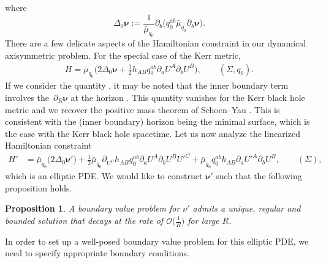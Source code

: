 \documentclass[pdftex]{sigma}
\def\ptl{\partial}%
\def\mbo#1{\boldsymbol{#1}}%
\def\halb{\frac{1}{2}}%
\numberwithin{equation}{section}
\newtheorem{Proposition}[Theorem]{Proposition}
\begin{document}
where
\[
\Delta_0 \mbo{\nu} := \frac{1}{\bar{\mu}_{q_0}} \ptl_b\bigl(q^{ab}_0 \bar{\mu}_{q_0} \ptl_b \mbo{\nu}\bigr).
\]
There are a few delicate aspects of the Hamiltonian constraint in our dynamical axisymmetric problem. For the special case of the Kerr metric,
\begin{align*}
H = \bar{\mu}_{q_0} \biggl(2 \Delta_0 \mbo{\nu} + \halb h_{AB} q_0^{ab} \ptl_a U^A \ptl_b U^B\biggr), \qquad (\Sigma, q_0).
\end{align*}
If we consider the quantity , it may be noted that the inner boundary term involves the~$\ptl_R \mbo{\nu}$ at the horizon . This quantity vanishes for the Kerr black hole metric and we recover the positive mass theorem of Schoen--Yau \cite{schoen-yau-1, schoen-yau-2}. This is consistent with the (inner boundary) horizon being the minimal surface, which is the case with the Kerr black hole spacetime.
Let us now analyze the linearized Hamiltonian constraint
\begin{align*}
H' &{}= \bar{\mu}_{q_0} \bigl(2 \Delta_0 \mbo{\nu}'\bigr) + \halb \bar{\mu}_{q_0} \ptl_{U^C} h_{AB} q_0^{ab} \ptl_a U^A \ptl_b U^B U'^C + \bar{\mu}_{q_0} q_0^{ab} h_{AB} \ptl_a U'^A \ptl_b U^B, \qquad (\Sigma),
\end{align*}
which is an elliptic PDE.
We would like to construct $\mbo{\nu}'$ such that the following proposition holds.

\begin{Proposition} \label{well-posedness-nu'}
	A boundary value problem for $\nu'$ admits a unique, regular and bounded solution that decays at the rate of $\mathcal{O}\bigl(\frac{1}{R}\bigr)$ for large $R$.
\end{Proposition}

In order to set up a well-posed boundary value problem for this elliptic PDE, we need to specify appropriate boundary conditions.
\end{document}

